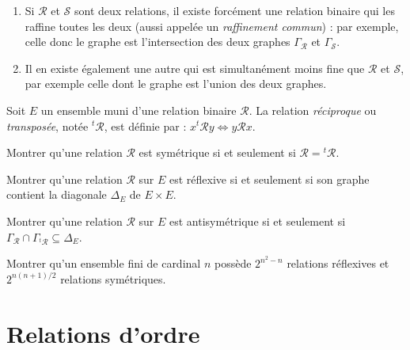 \begin{remarque}
\begin{enumerate}
\item Si $\mathcal R$ et $\mathcal S$ sont deux relations, il existe forcément une relation binaire qui les raffine toutes les deux (aussi appelée un \emph{raffinement commun}) : par exemple, celle donc le graphe est l'intersection des deux graphes $\Gamma_\mathcal R$ et $\Gamma_\mathcal S$.
\item Il en existe également une autre qui est simultanément moins fine que $\mathcal R$ et $\mathcal S$, par exemple celle dont le graphe est l'union des deux graphes.
\end{enumerate}
\end{remarque}


\begin{definition}
Soit $E$ un ensemble muni d'une relation binaire $\mathcal R$. La relation \emph{réciproque} ou \emph{transposée}, notée ${}^t\mathcal R$, est définie par : $x{}^t\mathcal R y \iff y\mathcal R x$. 
\end{definition}


\begin{exercice}
Montrer qu'une relation $\mathcal R$ est symétrique si et seulement si $\mathcal R = {}^t\mathcal R$.
\end{exercice}

\begin{exercice}
Montrer qu'une relation $\mathcal R$ sur $E$ est réflexive si et seulement si son graphe contient la diagonale $\Delta_E$ de $E\times E$.
\end{exercice}

\begin{exercice}
Montrer qu'une relation $\mathcal R$ sur $E$ est antisymétrique si et seulement si $\Gamma_\mathcal R \cap \Gamma_{{}^t\mathcal R} \subseteq \Delta_E$.
\end{exercice}

\begin{exercice}
Montrer qu'un ensemble fini de cardinal $n$ possède $2^{n^2-n}$ relations réflexives et $2^{n(n+1)/2}$ relations symétriques.
\end{exercice}

\section{Relations d'ordre}

